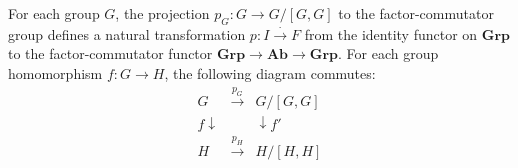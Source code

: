 For each group $G$, the projection $p_G: G \rightarrow G/[G,G]$ to the factor-commutator group defines a natural transformation $p: I \xrightarrow{\cdot} F$ from the identity functor on $\mathbf{Grp}$ to the factor-commutator functor $\mathbf{Grp} \rightarrow \mathbf{Ab} \rightarrow \mathbf{Grp}$. For each group homomorphism $f: G \rightarrow H$, the following diagram commutes:
\[
\begin{array}{ccc}
G & \xrightarrow{p_G} & G/[G,G] \\
{\scriptstyle f}\downarrow & & \downarrow{\scriptstyle f'} \\
H & \xrightarrow{p_H} & H/[H,H]
\end{array}
\]